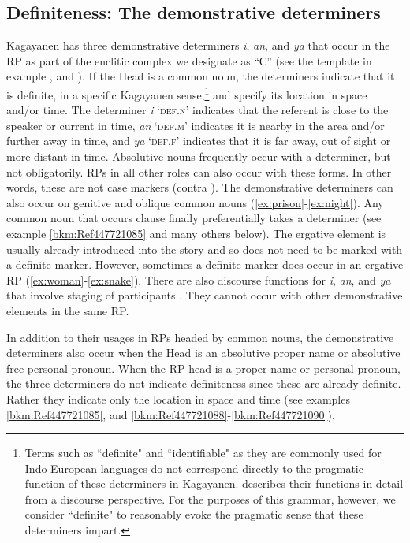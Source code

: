 \subsection{Definiteness: The demonstrative determiners}
\label{sec:definiteness}
Kagayanen has three demonstrative determiners \textit{i}, \textit{an}, and \textit{ya} that occur in the RP as part of the enclitic complex we designate as “Є” (see the template in example , and ). If the Head is a common noun, the determiners indicate that it is definite, in a specific Kagayanen sense,\footnote{Terms such as ``definite" and ``identifiable" as they are commonly used for Indo-European languages do not correspond directly to the pragmatic function of these determiners in Kagayanen. \citet{pebleyenclitic1999} describes their functions in detail from a discourse perspective. For the purposes of this grammar, however, we consider ``definite" to reasonably evoke the pragmatic sense that these determiners impart.} and specify its location in space and/or time.  The determiner \textit{i} `\textsc{def.n}’ indicates that the referent is close to the speaker or current in time, \textit{an} `\textsc{def.m}’ indicates it is nearby in the area and/or further away in time, and \textit{ya} `\textsc{def.f}’ indicates that it is far away, out of sight or more distant in time.
Absolutive nouns frequently occur with a determiner, but not obligatorily. RPs in all other roles can also occur with these forms.  In other words, these are not case markers (contra \citealt{harmon1977}). The demonstrative determiners can also occur on genitive and oblique common nouns (\ref{ex:prison}-\ref{ex:night}). Any common noun that occurs clause finally preferentially takes a determiner (see example \ref{bkm:Ref447721085} and many others below). The ergative element is usually already introduced into the story and so does not need to be marked with a definite marker. However, sometimes a definite marker does occur in an ergative RP (\ref{ex:woman}-\ref{ex:snake}). There are also discourse functions for \textit{i}, \textit{an}, and \textit{ya} that involve staging of participants \citep{pebleyenclitic1999}. They cannot occur with other demonstrative elements in the same RP.

In addition to their usages in RPs headed by common nouns, the demonstrative determiners also occur when the Head is an absolutive proper name or absolutive free personal pronoun. When the RP head is a proper name or personal pronoun, the three determiners do not indicate definiteness since these are already definite. Rather they indicate only the location in space and time (see examples \ref{bkm:Ref447721085}, and \ref{bkm:Ref447721088}-\ref{bkm:Ref447721090}).

